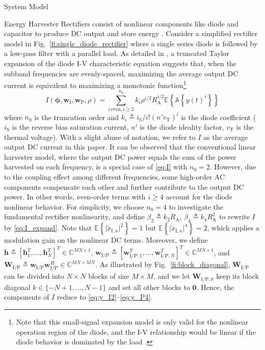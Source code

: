 \documentclass[journal]{IEEEtran}
\begin{document}
\begin{section}{System Model}
\begin{subsection}{Energy Harvester}
			Rectifiers consist of nonlinear components like diode and capacitor to produce DC output and store energy \cite{Pinuela2013}. Consider a simplified rectifier model in Fig.~\ref{fi:single_diode_rectifier} where a single series diode is followed by a low-pass filter with a parallel load. As detailed in \cite{Clerckx2016a}, a truncated Taylor expansion of the diode I-V characteristic equation suggests that, when the subband frequencies are evenly-spaced, maximizing the average output DC current is equivalent to maximizing a monotonic function\footnote{Note that this small-signal expansion model is only valid for the nonlinear operation region of the diode, and the I-V relationship would be linear if the diode behavior is dominated by the load \cite{Clerckx2016a}.}
			\begin{equation}\label{eq:I}
				I(\boldsymbol{\phi},\boldsymbol{w}_{\mathrm{I}},\boldsymbol{w}_{\mathrm{P}},\rho)=\sum_{i\,\mathrm{even},i\ge2}^{n_0}{k_i}{\rho^{i/2}}{R_{\mathrm{A}}^{i/2}}{\mathbb{E}\left\{\mathbb{A}\left\{y(t)^i\right\}\right\}}
			\end{equation}
			where $n_0$ is the truncation order and $k_i \triangleq i_{\mathrm{S}}/i!(n'v_{\mathrm{T}})^i$ is the diode coefficient ($i_{\mathrm{S}}$ is the reverse bias saturation current, $n'$ is the diode ideality factor, $v_{\mathrm{T}}$ is the thermal voltage). With a slight abuse of notation, we refer to $I$ as the average output DC current in this paper. It can be observed that the conventional linear harvester model, where the output DC power equals the sum of the power harvested on each frequency, is a special case of \eqref{eq:I} with $n_0=2$. However, due to the coupling effect among different frequencies, some high-order AC components compensate each other and further contribute to the output DC power. In other words, even-order terms with $i \ge 4$ account for the diode nonlinear behavior. For simplicity, we choose $n_0=4$ to investigate the fundamental rectifier nonlinearity, and define $\beta_2 \triangleq {k_2}{R_{\mathrm{A}}}$, $\beta_4 \triangleq {k_4}{R_{\mathrm{A}}^2}$ to rewrite $I$ by \eqref{eq:I_expand}. Note that $\mathbb{E}\left\{\lvert\tilde{x}_{\mathrm{I},n}\rvert^2\right\}=1$ but $\mathbb{E}\left\{\lvert\tilde{x}_{\mathrm{I},n}\rvert^4\right\}=2$, which applies a modulation gain on the nonlinear DC terms. Moreover, we define $\boldsymbol{h} \triangleq [\boldsymbol{h}_1^T,\dots,\boldsymbol{h}_N^T]^T \in \mathbb{C}^{MN \times 1}$, $\boldsymbol{w}_{\mathrm{I/P}} \triangleq [\boldsymbol{w}_{\mathrm{I/P},1}^T,\dots,\boldsymbol{w}_{\mathrm{I/P},N}^T]^T \in \mathbb{C}^{MN \times 1}$, and $\boldsymbol{W}_{\mathrm{I/P}} \triangleq \boldsymbol{w}_{\mathrm{I/P}}\boldsymbol{w}_{\mathrm{I/P}}^H \in \mathbb{C}^{MN \times MN}$. As illustrated by Fig.~\ref{fi:block_diagonal}, $\boldsymbol{W}_{\mathrm{I/P}}$ can be divided into $N \times N$ blocks of size $M \times M$, and we let $\boldsymbol{W}_{\mathrm{I/P},k}$ keep its block diagonal $k \in \{-N+1,\dots,N-1\}$ and set all other blocks to $\boldsymbol{0}$. Hence, the components of $I$ reduce to \eqref{eq:y_I2}--\eqref{eq:y_P4}.


\end{subsection}
\end{section}
\end{document}
